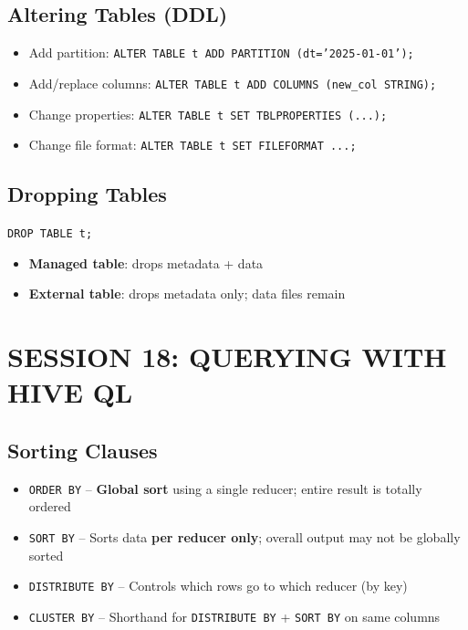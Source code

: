 \documentclass[11pt, onecolumn, a4paper]{article}
\begin{document}
\subsection{Altering Tables (DDL)}

\begin{itemize}
  \item Add partition: \texttt{ALTER TABLE t ADD PARTITION (dt='2025-01-01');}
  \item Add/replace columns: \texttt{ALTER TABLE t ADD COLUMNS (new\_col STRING);}
  \item Change properties: \texttt{ALTER TABLE t SET TBLPROPERTIES (...);}
  \item Change file format: \texttt{ALTER TABLE t SET FILEFORMAT ...;}
\end{itemize}

\subsection{Dropping Tables}

\texttt{DROP TABLE t;}
\begin{itemize}
  \item \textbf{Managed table}: drops metadata + data
  \item \textbf{External table}: drops metadata only; data files remain
\end{itemize}

\newpage
\section{SESSION 18: QUERYING WITH HIVE QL}

\subsection{Sorting Clauses}

\begin{itemize}
  \item \texttt{ORDER BY} -- \textbf{Global sort} using a single reducer; entire result is totally ordered
  \item \texttt{SORT BY} -- Sorts data \textbf{per reducer only}; overall output may not be globally sorted
  \item \texttt{DISTRIBUTE BY} -- Controls which rows go to which reducer (by key)
  \item \texttt{CLUSTER BY} -- Shorthand for \texttt{DISTRIBUTE BY} + \texttt{SORT BY} on same columns
\end{itemize}
\end{document}
